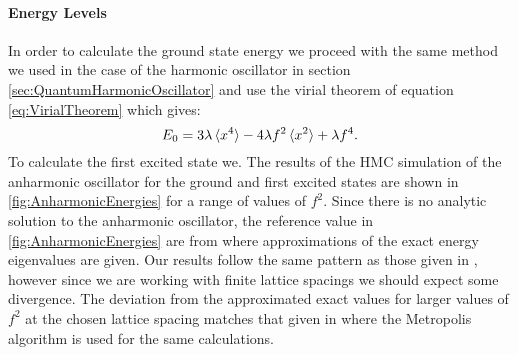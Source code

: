 \documentclass[12pt]{article}
\begin{document}
            \paragraph{Energy Levels}
                In order to calculate the ground state energy we proceed with the same method we used in the case of the harmonic oscillator in section \ref{sec:QuantumHarmonicOscillator} and use the virial theorem of equation \ref{eq:VirialTheorem} which gives:
                \begin{equation}
                    \label{eq:VirialTheoremAnharmonicOsillator}
                    E_0=3\lambda\braket{x^4}-4\lambda f^2\braket{x^2}+\lambda f^4.
                \end{equation}
                To calculate the first excited state we. The results of the HMC simulation of the anharmonic oscillator for the ground and first excited states are shown in \ref{fig:AnharmonicEnergies} for a range of values of $f^2$. Since there is no analytic solution to the anharmonic oscillator, the reference value in \ref{fig:AnharmonicEnergies} are from \cite{blankenbecler_degrand_sugar_1980} where approximations of the exact energy eigenvalues are given. Our results follow the same pattern as those given in \cite{blankenbecler_degrand_sugar_1980}, however since we are working with finite lattice spacings we should expect some divergence. The deviation from the approximated exact values for larger values of $f^2$ at the chosen lattice spacing matches that given in \cite{rodgers_raes} where the Metropolis algorithm is used for the same calculations.
\end{document}
